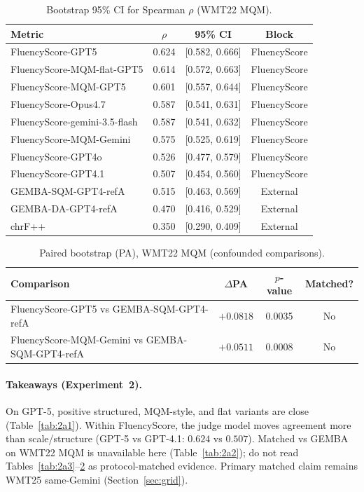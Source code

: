 \documentclass[11pt]{article}
\newcommand{\FS}{FluencyScore}
\begin{document}
\begin{table}[t]
\centering
\scriptsize
\caption{Bootstrap 95\% CI for Spearman $\rho$ (WMT22 MQM).}
\label{tab:2b}
\begin{tabularx}{\columnwidth}{>{\raggedright\arraybackslash}Xccc}
\toprule
Metric & $\rho$ & 95\% CI & Block \\
\midrule
\FS{}-GPT5 & 0.624 & [0.582, 0.666] & \FS{} \\
\FS{}-MQM-flat-GPT5 & 0.614 & [0.572, 0.663] & \FS{} \\
\FS{}-MQM-GPT5 & 0.601 & [0.557, 0.644] & \FS{} \\
\FS{}-Opus4.7 & 0.587 & [0.541, 0.631] & \FS{} \\
\FS{}-gemini-3.5-flash & 0.587 & [0.541, 0.632] & \FS{} \\
\FS{}-MQM-Gemini & 0.575 & [0.525, 0.619] & \FS{} \\
\FS{}-GPT4o & 0.526 & [0.477, 0.579] & \FS{} \\
\FS{}-GPT4.1 & 0.507 & [0.454, 0.560] & \FS{} \\
GEMBA-SQM-GPT4-refA & 0.515 & [0.463, 0.569] & External \\
GEMBA-DA-GPT4-refA & 0.470 & [0.416, 0.529] & External \\
chrF++ & 0.350 & [0.290, 0.409] & External \\
\bottomrule
\end{tabularx}

\end{table}

\begin{table}[t]
\centering
\scriptsize
\caption{Paired bootstrap (PA), WMT22 MQM (confounded comparisons).}
\label{tab:2c}
\begin{tabularx}{\columnwidth}{>{\raggedright\arraybackslash}Xccc}
\toprule
Comparison & $\Delta$PA & $p$-value & Matched? \\
\midrule
\FS{}-GPT5 vs GEMBA-SQM-GPT4-refA & $+0.0818$ & 0.0035 & No \\
\FS{}-MQM-Gemini vs GEMBA-SQM-GPT4-refA & $+0.0511$ & 0.0008 & No \\
\bottomrule
\end{tabularx}

\end{table}


\paragraph{Takeaways (Experiment~2).}
On GPT-5, positive structured, MQM-style, and flat variants are close
(Table~\ref{tab:2a1}).
Within \FS{}, the judge model moves agreement more than scale/structure
(GPT-5 vs GPT-4.1: $0.624$ vs $0.507$).
Matched vs GEMBA on WMT22 MQM is unavailable here
(Table~\ref{tab:2a2}); do not read Tables~\ref{tab:2a3}--\ref{tab:2c} as
protocol-matched evidence.
Primary matched claim remains WMT25 same-Gemini (Section~\ref{sec:grid}).
\end{document}
